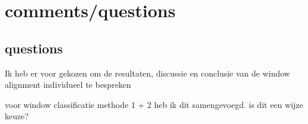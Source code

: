 \section{comments/questions}
\subsection{questions}
Ik heb er voor gekozen om de 
resultaten, discussie en conclusie van de window alignment individueel te bespreken

voor window classificatie methode 1 + 2  heb ik dit samengevoegd.
is dit een wijze keuze?


